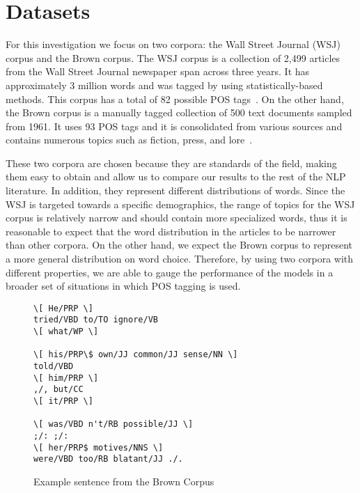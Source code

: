\section{Datasets}
\label{sec:datasets}
For this investigation we focus on two corpora: the Wall Street Journal (WSJ) corpus and the Brown corpus. The WSJ corpus is a collection of 2,499 articles from the Wall Street Journal newspaper span across three years. It has approximately 3 million words and was tagged by using statistically-based methods. This corpus has a total of 82 possible POS tags~\cite{wsjCorpus}. On the other hand, the Brown corpus is a manually tagged collection of 500 text documents sampled from 1961. It uses 93 POS tags and it is consolidated from various sources and contains numerous topics such as fiction, press, and lore~\cite{brownCorpus}.

These two corpora are chosen because they are standards of the field, making them easy to obtain and allow us to compare our results to the rest of the NLP literature. In addition, they represent different distributions of words. Since the WSJ is targeted towards a specific demographics, the range of topics for the WSJ corpus is relatively narrow and should contain more specialized words, thus it is reasonable to expect that the word distribution in the articles to be narrower than other corpora. On the other hand, we expect the Brown corpus to represent a more general distribution on word choice. Therefore, by using two corpora with different properties, we are able to gauge the performance of the models in a broader set of situations in which POS tagging is used.

\begin{figure}[ht]
 \begin{Verbatim}[frame=single,framesep=5mm]
\[ He/PRP \]
tried/VBD to/TO ignore/VB
\[ what/WP \]

\[ his/PRP\$ own/JJ common/JJ sense/NN \]
told/VBD
\[ him/PRP \]
,/, but/CC
\[ it/PRP \]

\[ was/VBD n't/RB possible/JJ \]
;/: ;/:
\[ her/PRP$ motives/NNS \]
were/VBD too/RB blatant/JJ ./.
\end{Verbatim}
\caption{Example sentence from the Brown Corpus~\cite{brownCorpus} \label{brownExample}}
\end{figure}
